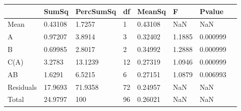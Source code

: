 \begin{table} 
\begin{tabular}{llllllll}
 & SumSq & PercSumSq & df & MeanSq & F & Pvalue \\ 
 \hline 
Mean & 0.43108 & 1.7257 & 1 & 0.43108 & NaN & NaN \\ 
A & 0.97207 & 3.8914 & 3 & 0.32402 & 1.1885 & 0.000999 \\ 
B & 0.69985 & 2.8017 & 2 & 0.34992 & 1.2888 & 0.000999 \\ 
C(A) & 3.2783 & 13.1239 & 12 & 0.27319 & 1.0946 & 0.000999 \\ 
AB & 1.6291 & 6.5215 & 6 & 0.27151 & 1.0879 & 0.006993 \\ 
Residuals & 17.9693 & 71.9358 & 72 & 0.24957 & NaN & NaN \\ 
Total & 24.9797 & 100 & 96 & 0.26021 & NaN & NaN \\ 
\end{tabular} 
\end{table} 
